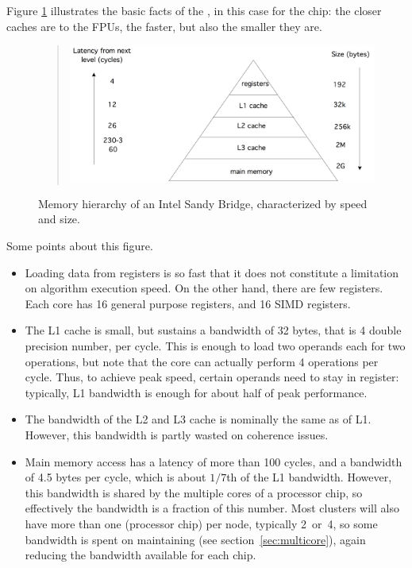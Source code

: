 Figure \ref{fig:hierarchy} illustrates the basic facts of the
, in
this case for the  chip: the
closer caches are to the \acp{FPU}, the faster, but also the
smaller they are.
\begin{figure}[ht]
  \begin{quote}
  \includegraphics[scale=.11]{graphics-public/hierarchysb}
  \end{quote}
  \caption{Memory hierarchy of an Intel Sandy Bridge, characterized by speed and size.}
  \label{fig:hierarchy}
\end{figure}
Some points about this figure.
\begin{itemize}
\item Loading data from registers is so fast that it does not
  constitute a limitation on algorithm execution speed. On the other
  hand, there are few registers. Each core has 16 general purpose
  registers, and 16 SIMD registers.
\item The L1 cache is small, but sustains a bandwidth of 32 bytes,
  that is 4 double precision number, per cycle. This is enough to load
  two operands each for two operations, but note that the core can
  actually perform 4 operations per cycle. Thus, to achieve peak
  speed, certain operands need to stay in register: typically, L1 
  bandwidth is enough for about half of peak performance.
\item The bandwidth of the L2 and L3 cache is nominally the same as
  of L1. However, this bandwidth is partly wasted on coherence issues.
\item Main memory access has a latency of more than 100 cycles, and a
  bandwidth of 4.5 bytes per cycle, which is about $1/7$th of the L1
  bandwidth. However, this bandwidth is shared by the multiple cores
  of a processor chip, so effectively the bandwidth is a fraction of
  this number. Most clusters will also have more than one
   (processor chip) per node, typically 2~or~4, so
  some bandwidth is spent on maintaining
   (see section~\ref{sec:multicore}),
  again reducing the bandwidth available for each chip.
\end{itemize}

